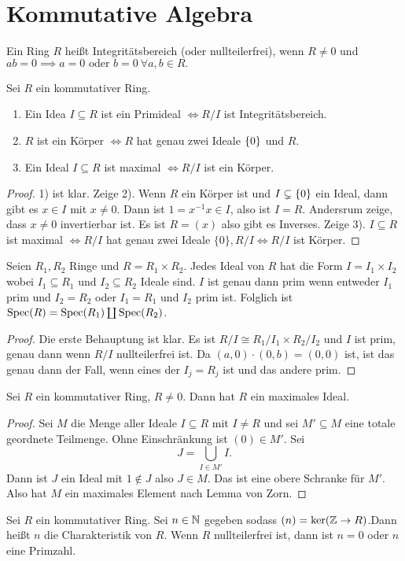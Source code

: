 \section{Kommutative Algebra}

\begin{Def}
    Ein Ring $R$ heißt Integritätsbereich (oder nullteilerfrei), wenn $R\neq 0$ und $ab=0\implies a=0 \text{ oder } b=0 \ \forall a,b\in R.$
\end{Def}
\begin{Lemma} Sei $R$ ein kommutativer Ring.
\begin{enumerate}
    \item Ein Idea $I\subseteq R$ ist ein Primideal $\iff R/I$ ist Integritätsbereich.
    \item $R$ ist ein Körper $\iff R$ hat genau zwei Ideale $\{0\}$ und $R$.
    \item Ein Ideal $I\subseteq R$ ist maximal $\iff R/I$ ist ein Körper.
\end{enumerate}
\begin{proof}
    1) ist klar.
    Zeige 2). Wenn $R$ ein Körper ist und $I\subsetneq \{0\}$ ein Ideal, dann gibt es $x\in I$ mit $x\neq 0$. Dann ist $1=x^{-1}x\in I$, also ist $I=R$. Andersrum zeige, dass $x\neq 0$ invertierbar ist. Es ist $R=(x)$ also gibt es Inverses.
    Zeige 3). $I\subseteq R$ ist maximal $\iff R/I$ hat genau zwei Ideale $\{0\}, R/I \iff R/I$ ist Körper.
\end{proof}
\begin{Lemma}\label{Lem:IdealeProduktring}
    Seien $R_1,R_2$ Ringe und $R=R_1\times R_2$. Jedes Ideal von $R$ hat die Form $I=I_1\times I_2$ wobei $I_1\subseteq R_1$ und $I_2\subseteq R_2$ Ideale sind. $I$ ist genau dann prim wenn entweder $I_1$ prim und $I_2=R_2$ oder $I_1=R_1$ und $I_2$ prim ist.
    Folglich ist $\operatorname{Spec}(R)=\operatorname{Spec}(R_1)\coprod \operatorname{Spec}(R_2)$.
\end{Lemma}
\begin{proof}
    Die erste Behauptung ist klar. Es ist $R/I\cong R_1/I_1\times R_2/I_2$ und $I$ ist prim, genau dann wenn $R/I$ nullteilerfrei ist.
    Da $(a,0)\cdot (0,b)=(0,0)$ ist, ist das genau dann der Fall, wenn eines der $I_j=R_j$ ist und das andere prim.
\end{proof}

\begin{Satz}\label{Satz:ExMaxId}
    Sei $R$ ein kommutativer Ring, $R\neq 0$. Dann hat $R$ ein maximales Ideal.
\end{Satz}
\begin{proof}
    Sei $M$ die Menge aller Ideale $I\subseteq R$ mit $I\neq R$ und sei $M'\subseteq M$ eine totale geordnete Teilmenge.  Ohne Einschränkung ist $(0)\in M'$. Sei $$J=\bigcup\limits_{I\in M'}I.$$ Dann ist $J$ ein Ideal mit $1\not\in J$ also $J\in M$. Das ist eine obere Schranke für $M'$. Also hat $M$ ein maximales Element nach Lemma von Zorn.
\end{proof}
\end{Lemma}
\begin{Def}
    Sei $R$ ein kommutativer Ring. Sei $n\in \mathbb{N}$ gegeben sodass $(n)=\ker(\mathbb{Z}\to R)$.Dann heißt $n$ die Charakteristik von $R$. Wenn $R$ nullteilerfrei ist, dann ist $n=0$ oder $n$ eine Primzahl.
\end{Def}
